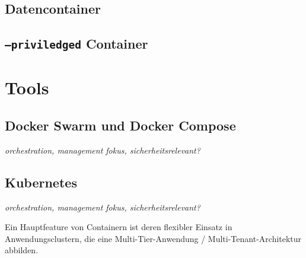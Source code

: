 \documentclass[../main.tex]{subfiles}
\begin{document}
    \subsection{Datencontainer}

    \subsection{\texttt{--priviledged} Container}

  \section{Tools}



    \subsection{Docker Swarm und Docker Compose}
      \emph{orchestration, management fokus, sicherheitsrelevant?}
    \subsection{Kubernetes}
      \emph{orchestration, management fokus, sicherheitsrelevant?}

      Ein Hauptfeature von Containern ist deren flexibler Einsatz in Anwendungsclustern, die eine Multi-Tier-Anwendung / Multi-Tenant-Architektur abbilden.
\end{document}
